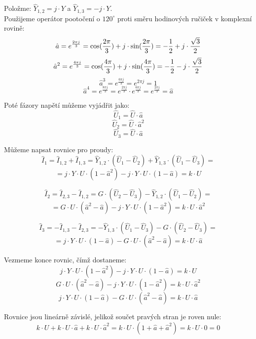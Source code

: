\documentclass{article}
\begin{document}
Položme: $\hat{Y}_{1,2} = j \cdot Y$ a $\hat{Y}_{1,3} = -j \cdot Y$.\\

Použijeme operátor pootočení o $120^\circ$ proti směru hodinových ručiček v komplexní rovině:
$$
    \hat{a} = e^{\frac{2 \pi j}{3}} = \textrm{cos}(\frac{2 \pi}{3}) + j \cdot \textrm{sin}(\frac{2 \pi}{3}) = -\frac{1}{2} + j \cdot \frac{\sqrt{3}}{2}
$$
$$
    \hat{a}^2 = e^{\frac{4 \pi j}{3}} = \textrm{cos}(\frac{4 \pi}{3}) + j \cdot \textrm{sin}(\frac{4 \pi}{3}) = -\frac{1}{2} - j \cdot \frac{\sqrt{3}}{2}
$$
$$
    \hat{a}^3 = e^{\frac{6 \pi j}{3}} = e^{2 \pi j} = 1
$$
$$
    \hat{a}^4 = e^{\frac{8 \pi j}{3}} = e^{\frac{2 \pi j}{3}} \cdot e^{\frac{6 \pi j}{3}} = e^{\frac{2 \pi j}{3}} = \hat{a}
$$

Poté fázory napětí můžeme vyjádřit jako:
$$
    \hat{U}_1 = \hat{U} \cdot \hat{a}
$$
$$
    \hat{U}_2 = \hat{U} \cdot \hat{a}^2
$$
$$
    \hat{U}_3 = \hat{U} \cdot \hat{a}
$$

Můžeme napsat rovnice pro proudy:
$$
    \hat{I}_1 = \hat{I}_{1,2} + \hat{I}_{1,3} = \hat{Y}_{1,2} \cdot \left( \hat{U}_1 - \hat{U}_2 \right) + \hat{Y}_{1,3} \cdot \left( \hat{U}_1 - \hat{U}_3 \right) =
$$
$$
    = j \cdot Y \cdot U \cdot \left( 1 - \hat{a}^2 \right) - j \cdot Y \cdot U \cdot \left( 1 - \hat{a} \right) = k \cdot U
$$

$$
    \hat{I}_2 = \hat{I}_{2,3} - \hat{I}_{1,2} = G \cdot \left( \hat{U}_2 - \hat{U}_3 \right) - \hat{Y}_{1,2} \cdot \left( \hat{U}_1 - \hat{U}_2 \right) =
$$
$$
    = G \cdot U \cdot \left( \hat{a}^2 - \hat{a} \right) - j \cdot Y \cdot U \cdot \left( 1 - \hat{a}^2 \right) = k \cdot U \cdot \hat{a}^2
$$

$$
    \hat{I}_3 = - \hat{I}_{1,3} - \hat{I}_{2,3} = - \hat{Y}_{1,3} \cdot \left( \hat{U}_1 - \hat{U}_3 \right) - G \cdot \left( \hat{U}_2 - \hat{U}_3 \right) =
$$
$$
    = j \cdot Y \cdot U \cdot \left( 1 - \hat{a} \right) - G \cdot U \cdot \left( \hat{a}^2 - \hat{a} \right) = k \cdot U \cdot \hat{a}
$$

Vezmeme konce rovnic, čímž dostaneme:
$$
    j \cdot Y \cdot U \cdot \left( 1 - \hat{a}^2 \right) - j \cdot Y \cdot U \cdot \left( 1 - \hat{a} \right) = k \cdot U
$$
$$
    G \cdot U \cdot \left( \hat{a}^2 - \hat{a} \right) - j \cdot Y \cdot U \cdot \left( 1 - \hat{a}^2 \right) = k \cdot U \cdot \hat{a}^2
$$
$$
    j \cdot Y \cdot U \cdot \left( 1 - \hat{a} \right) - G \cdot U \cdot \left( \hat{a}^2 - \hat{a} \right) = k \cdot U \cdot \hat{a}
$$

Rovnice jsou lineárně závislé, jelikož součet pravých stran je roven nule:
$$
    k \cdot U + k \cdot U \cdot \hat{a} + k \cdot U \cdot \hat{a}^2 = k \cdot U \cdot \left( 1 + \hat{a} + \hat{a}^2 \right) = k \cdot U \cdot 0 = 0
$$
\end{document}
